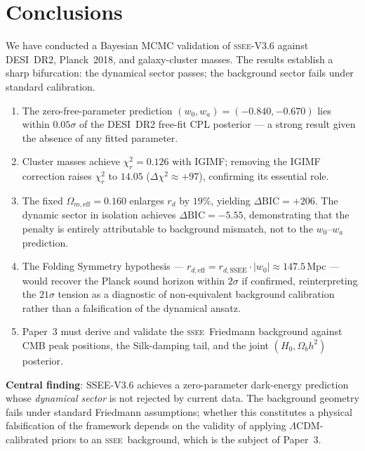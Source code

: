 \documentclass[12pt,a4paper]{article}
\newcommand{\SSEE}{\ifmmode\mathrm{SSEE}\else\textsc{ssee}\fi}
\newcommand{\LCDM}{\ifmmode\Lambda\mathrm{CDM}\else$\Lambda$CDM\fi}
\newcommand{\wz}{w_0}
\newcommand{\wa}{w_a}
\newcommand{\rdSSEE}{r_{d,\mathrm{SSEE}}}
\newcommand{\rdeff}{r_{d,\mathrm{eff}}}
\begin{document}
\section{Conclusions}
\label{sec:conclusions}

We have conducted a Bayesian MCMC validation of \SSEE-V3.6 against
DESI~DR2, Planck~2018, and galaxy-cluster masses. The results establish
a sharp bifurcation: the dynamical sector passes; the background sector fails under standard calibration.

\begin{enumerate}
  \item The zero-free-parameter prediction $(\wz,\wa)=(-0.840,-0.670)$
    lies within $0.05\sigma$ of the DESI~DR2 free-fit CPL posterior —
    a strong result given the absence of any fitted parameter.

  \item Cluster masses achieve $\chi^2_r=0.126$ with IGIMF; removing
    the IGIMF correction raises $\chi^2_r$ to $14.05$
    ($\Delta\chi^2\approx+97$), confirming its essential role.

  \item The fixed $\Omega_{m,\mathrm{eff}}=0.160$ enlarges $r_d$
    by $19\%$, yielding $\Delta\mathrm{BIC}=+206$. The dynamic sector
    in isolation achieves $\Delta\mathrm{BIC}=-5.55$, demonstrating
    that the penalty is entirely attributable to background mismatch,
    not to the $\wz$--$\wa$ prediction.

  \item The Folding Symmetry hypothesis — $\rdeff=\rdSSEE\cdot|\wz|
    \approx147.5$\,Mpc — would recover the Planck sound horizon within
    $2\sigma$ if confirmed, reinterpreting the $21\sigma$ tension as a
    diagnostic of non-equivalent background calibration rather than a
    falsification of the dynamical ansatz.

  \item Paper~3 must derive and validate the \SSEE\ Friedmann background
    against CMB peak positions, the Silk-damping tail, and the joint
    $(H_0,\Omega_b h^2)$ posterior.
\end{enumerate}

\noindent\textbf{Central finding}: SSEE-V3.6 achieves a zero-parameter
dark-energy prediction whose \emph{dynamical sector} is not rejected by current data.
The background geometry fails under standard Friedmann assumptions;
whether this constitutes a physical falsification of the framework depends on
the validity of applying \LCDM-calibrated priors to an \SSEE\ background,
which is the subject of Paper~3.
\end{document}
